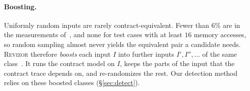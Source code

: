 \documentclass[letterpaper,twocolumn,10pt]{article}
\theoremstyle{definition}
\begin{document}
\paragraph{Boosting.}
Uniformly random inputs are rarely contract-equivalent. Fewer than $6\%$ are in the
measurements of~\cite{hide_seek}, and none for test cases with at least $16$ memory accesses,
so random sampling almost never yields the equivalent pair a candidate needs.
\textsc{Revizor} therefore \emph{boosts} each input $I$ into further inputs $I',I'',\dots$ of
the same class~\cite{hide_seek}. It runs the contract model on $I$, keeps the parts of the
input that the contract trace depends on, and re-randomizes the rest. Our detection method relies
on these boosted classes (\S\ref{sec:detect}).

\end{document}
